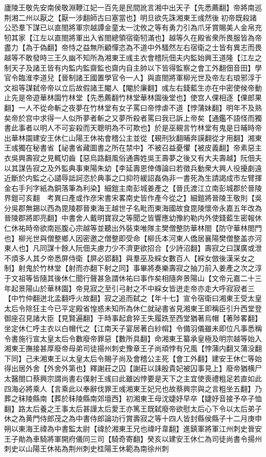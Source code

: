 廬陵王敬先安南侯敬淵鞭江妃一百先是民間訛言湘中出天子【先悉薦翻】帝將南巡荆湘二州以厭之【厭一涉翻師古曰塞當也】明旦欲先誅湘東王彧然後初帝既殺諸公恐羣下謀已以直閤將軍宗越譚金童太一沈攸之等有勇力引為爪牙賞賜美人金帛充牣其家【江左以直閤將軍出入省閤總領宿衛牣滿也】越等久在殿省衆所畏服皆為帝盡力【為于偽翻】帝恃之益無所顧憚恣為不道中外騷然左右宿衛之士皆有異志而畏越等不敢發時三王久幽不知所為湘東王彧主衣會稽阮佃夫内監始興王道隆【江左之制天子及諸王皆有内監内監齋監也齋内自主帥以下皆得監察之會工外翻佃音田】學官令臨淮李道兒【晉制諸王國置學官令一人】與直閤將軍柳光世及帝左右琅邪淳于文祖等謀弑帝帝以立后故假諸王閹人【閹於廉翻】彧左右錢藍生亦在中密使候帝動止先是帝遊華林園竹林堂【先悉薦翻竹林堂華林園後堂也】使宫人倮相逐【倮郎果翻】一人不從命斬之夜夢在竹林堂有女子罵曰帝悖虐不道【悖蒲妹翻】明年不及熟矣帝於宫中求得一人似所夢者斬之又夢所殺者罵曰我已訴上帝矣【通鑑不語怪而獨書此事者以明人不可妄殺而天聰明為不可欺也】於是巫覡言竹林堂有鬼是日晡時帝出華林園建安王休仁山陽王休祐會稽公主並從【覡刑狄翻晡奔謨翻從才用翻】湘東王彧獨在秘書省【祕書省藏圖書之所在禁中】不被召益憂懼【被皮義翻】帝素惡主衣吳興壽寂之見輒切齒【惡烏路翻風俗通壽姓吳王壽夢之後又有大夫壽越】阮佃夫以其謀告寂之及外監典事東陽朱幼【李延壽恩倖傳論曰若徵兵動衆大興人役擾劇遠近斷於内監之心譴辱詆訶恣於典事之口抑符緩詔姦偽非一書死為生請謁成市左臂揮金右手刋字紙為銅落筆為利染】細鎧主南彭城姜產之【晉氏渡江立南彭城郡於晉陵界鎧可亥翻　考異曰產或作彦宋書宋畧南史皆作產今從之】細鎧將晉陵王敬則【吳分吳郡無錫以西為毘陵郡晉東海王越世子名毗而東海國故食毘陵懷帝永嘉五年改為晉陵郡將即亮翻】中書舍人戴明寶寂之等聞之皆響應幼豫約勒内外使錢藍生密報休仁休祐時帝欲南廵腹心宗越等並聽出外裝束唯隊主樊僧整防華林閤【防守華林閤門也】柳光世與僧整鄉人因密邀之僧整即受命【柳氏本河東人僑居襄陽樊僧整盖亦河東人也】凡同謀十餘人阮佃夫慮力少不濟更欲招合【少詩沼翻】壽寂之曰謀廣或泄不煩多人其夕帝悉屏侍衛【屏必郢翻】與羣巫及綵女數百人【綵女倣後漢采女之制】射鬼於竹林堂【射而亦翻下射之同】事畢將奏樂壽寂之抽刀前入姜產之次之淳于文祖等皆隨其後休仁聞行聲甚急謂休祐曰事作矣相隨奔景陽山【文帝元嘉二十三年起景陽山於華林園】帝見寂之至引弓射之不中綵女皆迸走帝亦走大呼寂寂者三【中竹仲翻迸北孟翻呼火故翻】寂之追而弑之【年十七】宣令宿衛曰湘東王受太皇太后令除狂主今已平定殿省惶惑未知所為休仁就祕書省見湘東王即稱臣引升西堂登御座召見諸大臣【見賢遍翻】于時事起倉猝王失履跣至西堂猶著烏帽【著陟畧翻】坐定休仁呼主衣以白帽代之【江南天子宴居著白紗㡌】令備羽儀雖未即位凡事悉稱令書施行宣太皇太后令數廢帝罪惡【數所具翻】命湘東王纂承皇極及明宗越等始入湘東王撫接甚厚廢帝母弟司徒揚州刺史豫章王子尚頑悖有兄風【悖蒲内翻又蒲没翻下同】己未湘東王以太皇太后令賜子尚及會稽公主死【會工外翻】建安王休仁等始得出居外舍【外舍外第也】釋謝莊之囚【謝莊以誄殷貴妃被囚事見上】廢帝猶横尸太醫閤口蔡興宗謂尚書右僕射王彧曰此雖凶悖要是天下之主宜使喪禮粗足若直如此四海必將乘人【言乘此以奉辭伐罪王彧湘東王妃兄也故蔡興宗與之言粗坐五翻】乃葬之秣陵縣南【葬於秣陵縣南郊壇西】初湘東王母沈婕妤早卒【婕妤音接予卒子恤翻】路太后養之王事太后甚謹太后愛王亦篤王既弑廢帝欲慰太后心下令以太后弟子休之為黄門侍郎茂之為中書侍郎論功行賞壽寂之等十四人皆封縣侯縣子十二月庚申朔以東海王禕為中書監太尉【禕於湘東王兄也禕吁韋翻】進鎮軍將軍江州刺史晉安王子勛為車騎將軍開府儀同三司【騎奇寄翻】癸亥以建安王休仁為司徒尚書令揚州刺史以山陽王休祐為荆州刺史桂陽王休範為南徐州刺